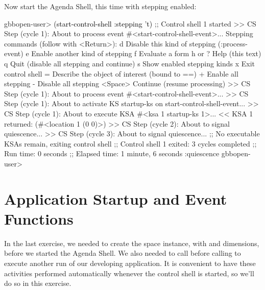 \documentclass[10pt,twoside,english,pdftex]{article}
\begin{document}
%
%
Now start the Agenda Shell, this time with stepping enabled:
%
\W\supp
\begin{example}
\textcolor{darkergray}{%
  gbbopen-user> \textcolor{black}{(start-control-shell :stepping 't)}
  ;; Control shell 1 started
  >> CS Step (cycle 1):
     About to process event #<start-control-shell-event>... 
  Stepping commands (follow with <Return>):
     d       Disable this kind of stepping (:process-event)
     e       Enable another kind of stepping
     f       Evaluate a form
     h or ?  Help (this text)
     q       Quit (disable all stepping and continue)
     s       Show enabled stepping kinds
     x       Exit control shell
     =       Describe the object of interest (bound to ==)
     +       Enable all stepping
     -       Disable all stepping
     <Space> Continue (resume processing)
  >> CS Step (cycle 1):
     About to process event #<start-control-shell-event>...  
  >> CS Step (cycle 1):
     About to activate KS startup-ks on
       start-control-shell-event... 
  >> CS Step (cycle 1):
     About to execute KSA #<ksa 1 startup-ks 1>... 
  << KSA 1 returned: (#<location 1 (0 0)>)
  >> CS Step (cycle 2):
     About to signal quiescence... 
  >> CS Step (cycle 3):
     About to signal quiescence... 
  ;; No executable KSAs remain, exiting control shell
  ;; Control shell 1 exited: 3 cycles completed
  ;; Run time: 0 seconds
  ;; Elapsed time: 1 minute, 6 seconds
  :quiescence
  gbbopen-user>}
\end{example}


\T\markright{}%
\T\pagestyle{plain}
\T\cleardoublepage
\W{}
\T\pagestyle{fancy}
\T\thispagestyle{fancybottom}
\T\renewcommand{\headrulewidth}{0pt}
\section{Application Startup and Event Functions}
\label{sec:application-startup}%

In the last exercise, we needed to create the  space
instance, with  and  dimensions, before we started the Agenda
Shell.  We also needed to call 
before calling  to execute another run of
our developing application.  It is convenient to have these activities
performed automatically whenever the control shell is started, so we'll do so
in this exercise.
\end{document}
